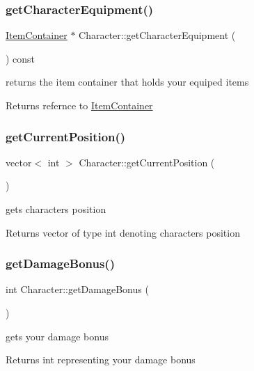 \subsubsection{\texorpdfstring{get\+Character\+Equipment()}{getCharacterEquipment()}}
{\footnotesize\ttfamily \hyperlink{class_item_container}{Item\+Container} $\ast$ Character\+::get\+Character\+Equipment (\begin{DoxyParamCaption}{ }\end{DoxyParamCaption}) const}

returns the item container that holds your equiped items \begin{DoxyReturn}{Returns}
refernce to \hyperlink{class_item_container}{Item\+Container} 
\end{DoxyReturn}
\hypertarget{class_character_a2833ce301aebf894598a0b0f522500bb}{}\label{class_character_a2833ce301aebf894598a0b0f522500bb} 
\subsubsection{\texorpdfstring{get\+Current\+Position()}{getCurrentPosition()}}
{\footnotesize\ttfamily vector$<$ int $>$ Character\+::get\+Current\+Position (\begin{DoxyParamCaption}{ }\end{DoxyParamCaption})}

gets characters position \begin{DoxyReturn}{Returns}
vector of type int denoting characters position 
\end{DoxyReturn}
\hypertarget{class_character_a20ac6eab8a1df8ce849ad1015f656f96}{}\label{class_character_a20ac6eab8a1df8ce849ad1015f656f96} 
\subsubsection{\texorpdfstring{get\+Damage\+Bonus()}{getDamageBonus()}}
{\footnotesize\ttfamily int Character\+::get\+Damage\+Bonus (\begin{DoxyParamCaption}{ }\end{DoxyParamCaption})}

gets your damage bonus \begin{DoxyReturn}{Returns}
int representing your damage bonus 
\end{DoxyReturn}
\hypertarget{class_character_a45d67678325375d1c0cfb7fc5cc32ec1}{}\label{class_character_a45d67678325375d1c0cfb7fc5cc32ec1} 
